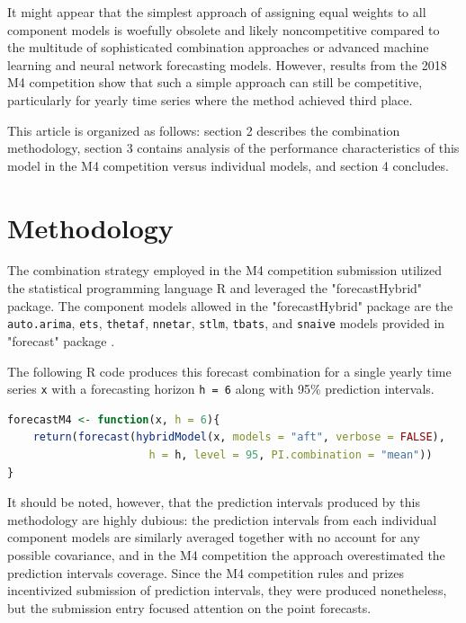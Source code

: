 \documentclass[11pt,3p,review,authoryear]{elsarticle}
\begin{document}
It might appear that the simplest approach of assigning equal weights to all component models is woefully obsolete and likely noncompetitive compared to the multitude of sophisticated combination approaches or advanced machine learning and neural network forecasting models. However, results from the 2018 M4 competition show that such a simple approach can still be competitive, particularly for yearly time series where the method achieved third place.

This article is organized as follows: section 2 describes the combination methodology, section 3 contains analysis of the performance characteristics of this model in the M4 competition versus individual models, and section 4 concludes.

\section{Methodology}
The combination strategy employed in the M4 competition submission utilized the statistical programming language R \citep{Rlang} and leveraged the "forecastHybrid" \citep{forecastHybrid} package. The component models allowed in the "forecastHybrid" package are the  \lstinline{auto.arima}, \lstinline{ets}, \lstinline{thetaf}, \lstinline{nnetar}, \lstinline{stlm}, \lstinline{tbats}, and \lstinline{snaive} models provided in "forecast" package \citep{Forecast}.


The following R code produces this forecast combination for a single yearly time series \lstinline{x} with a forecasting horizon \lstinline{h = 6} along with 95\% prediction intervals.
\begin{lstlisting}[language=R]
forecastM4 <- function(x, h = 6){
    return(forecast(hybridModel(x, models = "aft", verbose = FALSE),
                      h = h, level = 95, PI.combination = "mean"))
}
\end{lstlisting}

It should be noted, however, that the prediction intervals produced by this methodology are highly dubious: the prediction intervals from each individual component models are similarly averaged together with no account for any possible covariance, and in the M4 competition the approach overestimated the prediction intervals coverage. Since the M4 competition rules and prizes incentivized submission of prediction intervals, they were produced nonetheless, but the submission entry focused attention on the point forecasts.
\end{document}
